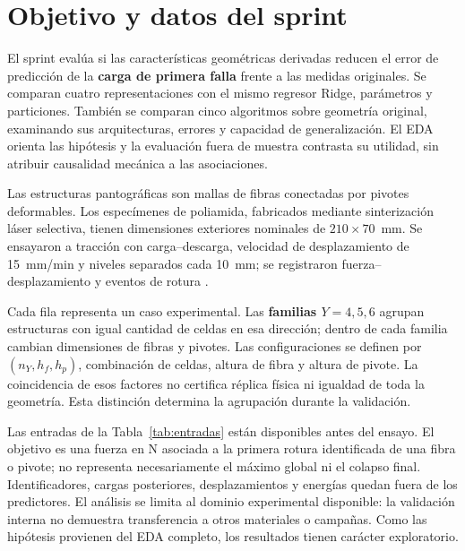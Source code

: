 \section{Objetivo y datos del sprint}
\label{sec:introduccion}
\label{sec:datos}

El sprint evalúa si las características geométricas derivadas reducen el error de predicción de la \textbf{carga de primera falla} frente a las medidas originales. Se comparan cuatro representaciones con el mismo regresor Ridge, parámetros y particiones. También se comparan cinco algoritmos sobre geometría original, examinando sus arquitecturas, errores y capacidad de generalización. El EDA orienta las hipótesis y la evaluación fuera de muestra contrasta su utilidad, sin atribuir causalidad mecánica a las asociaciones.

Las estructuras pantográficas son mallas de fibras conectadas por pivotes deformables. Los especímenes de poliamida, fabricados mediante sinterización láser selectiva, tienen dimensiones exteriores nominales de $210\times70$~mm. Se ensayaron a tracción con carga--descarga, velocidad de desplazamiento de 15~mm/min y niveles separados cada 10~mm; se registraron fuerza--desplazamiento y eventos de rotura \cite{venditti2025}.

Cada fila representa un caso experimental. Las \textbf{familias $Y=4,5,6$} agrupan estructuras con igual cantidad de celdas en esa dirección; dentro de cada familia cambian dimensiones de fibras y pivotes. Las configuraciones se definen por $(n_Y,h_f,h_p)$, combinación de celdas, altura de fibra y altura de pivote. La coincidencia de esos factores no certifica réplica física ni igualdad de toda la geometría. Esta distinción determina la agrupación durante la validación.

Las entradas de la Tabla~\ref{tab:entradas} están disponibles antes del ensayo. El objetivo es una fuerza en N asociada a la primera rotura identificada de una fibra o pivote; no representa necesariamente el máximo global ni el colapso final. Identificadores, cargas posteriores, desplazamientos y energías quedan fuera de los predictores. El análisis se limita al dominio experimental disponible: la validación interna no demuestra transferencia a otros materiales o campañas. Como las hipótesis provienen del EDA completo, los resultados tienen carácter exploratorio.

